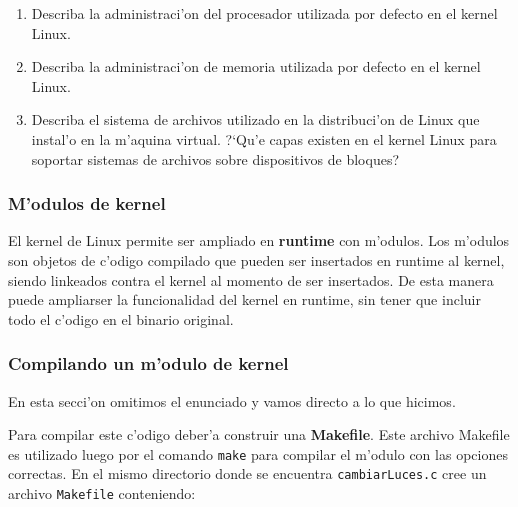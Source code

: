 \begin{enumerate}

\item Describa la administraci'on del procesador utilizada por defecto en el kernel Linux.
\vspace{.5cm}



\item Describa la administraci'on de memoria utilizada por defecto en el kernel Linux.
\vspace{.5cm}


\item Describa el sistema de archivos utilizado en la distribuci'on de Linux que instal'o en la m'aquina virtual.
?`Qu'e capas existen en el kernel Linux para soportar sistemas de
archivos sobre dispositivos de bloques?

\vspace{.5cm}



\end{enumerate}

\subsubsection{M'odulos de kernel}

El kernel de Linux permite ser ampliado en \textbf{runtime} con m'odulos. Los m'odulos son objetos de c'odigo compilado
que pueden ser insertados en runtime al kernel, siendo linkeados contra el kernel al momento de ser insertados. De esta
manera puede ampliarser la funcionalidad del kernel en runtime, sin tener que incluir todo el c'odigo en el binario
original.

\subsubsection{Compilando un m'odulo de kernel}

En esta secci'on omitimos el enunciado y vamos directo a lo que hicimos.


Para compilar este c'odigo deber'a construir una \textbf{Makefile}. Este archivo Makefile es utilizado luego por el
comando \texttt{make} para compilar el m'odulo con las opciones correctas. En el mismo directorio donde se encuentra
\texttt{cambiarLuces.c} cree un archivo \texttt{Makefile} conteniendo:


